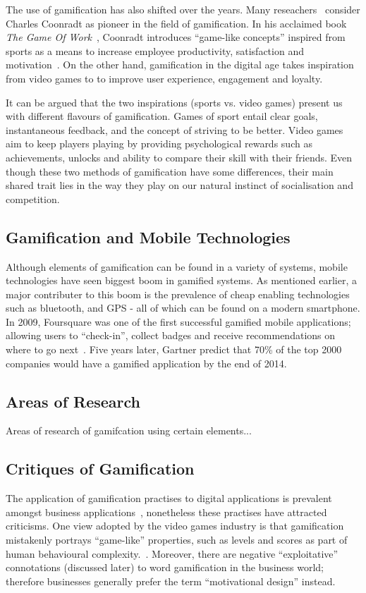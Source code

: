 The use of gamification has also shifted over the years. Many reseachers~\cite{deterding2014ambiguity}\cite{park2014study} consider Charles Coonradt as pioneer in the field of gamification. In his acclaimed book \emph{The Game Of Work}~\cite{coonradt1985game}, Coonradt introduces ``game-like concepts'' inspired from sports as a means to increase employee productivity, satisfaction and motivation~\cite{coonradt1985game}. On the other hand, gamification in the digital age takes inspiration from video games to to improve user experience, engagement and loyalty.~\cite{ventata}

It can be argued that the two inspirations (sports vs. video games) present us with different flavours of gamification. Games of sport entail clear goals, instantaneous feedback, and the concept of striving to be better. Video games aim to keep players playing by providing psychological rewards such as achievements, unlocks and ability to compare their skill with their friends. Even though these two methods of gamification have some differences, their main shared trait lies in the way they play on our natural instinct of socialisation and competition. ~\cite{grove2011gamification}

\subsection{Gamification and Mobile Technologies}
Although elements of gamification can be found in a variety of systems, mobile technologies have seen biggest boom in gamified systems. As mentioned earlier, a major contributer to this boom is the prevalence of cheap enabling technologies such as bluetooth, and GPS - all of which can be found on a modern smartphone. In 2009, Foursquare was one of the first successful gamified mobile applications; allowing users to ``check-in'', collect badges and receive recommendations on where to go next~\cite{zichermann2011gamification}. Five years later, Gartner predict that 70\% of the top 2000 companies would have a gamified application by the end of 2014.~\cite{gartner70}

\subsection{Areas of Research}
Areas of research of gamifcation using certain elements...
\clearpage{}
\subsection{Critiques of Gamification}
The application of gamification practises to digital applications is prevalent amongst business applications~\cite{gartner70}, nonetheless these practises have attracted criticisms. One view adopted by the video games industry is that gamification mistakenly portrays ``game-like'' properties, such as levels and scores as part of human behavioural complexity.~\cite{bogost2011gamification}. Moreover, there are negative ``exploitative'' connotations (discussed later) to word gamification in the business world; therefore businesses generally prefer the term ``motivational design'' instead. 

